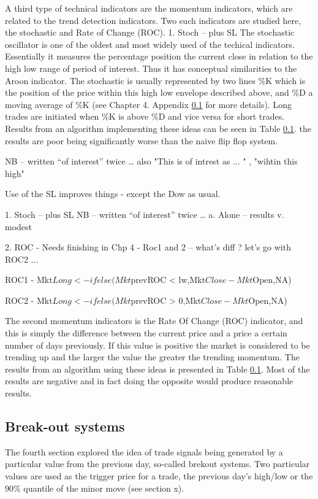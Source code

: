 A third type of technical indicators are the momentum indicators, which are related to the trend detection indicators. Two such indicators are studied here, the stochastic and Rate of Change (ROC). 
1.	Stoch – plus SL
The stochastic oscillator is one of the oldest and most widely used of the techical indicators. Essentially it measures the percentage position the current close in relation to the high low range of period of interest. Thus it has conceptual similarities to the Aroon indicator. The stochastic is usually represented by two lines \%K which is the position of the price within this high low envelope described above, and \%D a moving average of \%K (see Chapter 4.  Appendix \ref{} for more details). Long trades are initiated when \%K is above \%D and vice versa for short trades. Results from an algorithm implementing these ideas can be seen in Table \ref{}. the results are poor being significantly worse than the naive flip flop system. 

NB – written “of interest” twice … also "This is of intrest as ... " , "wihtin this high"

Use of the SL improves things - except the Dow as usual.

1.	Stoch – plus SL
NB – written “of interest” twice …
a.	Alone – results v. modest


2.	ROC
-	Needs finishing in Chp 4
-	Roc1 and 2 – what’s diff ? let's go with ROC2 ...

ROC1 - Mkt$Long <- ifelse(Mkt$prevROC < lw,Mkt$Close-Mkt$Open,NA)

ROC2 - Mkt$Long <- ifelse(Mkt$prevROC > 0,Mkt$Close-Mkt$Open,NA)

The second momentum indicators is the Rate Of Change (ROC) indicator, and this is simply the difference between the current price and a price a certain number of days previously. If this value is positive the market is considered to be trending up and the larger the value the greater the trending momentum. The results from an algorithm using these ideas is presented in Table \ref{}. Most of the results are negative and in fact doing the opposite would produce reasonable results.


\subsection{Break-out systems}

The fourth section explored the idea of trade signals being generated by a particular value from the previous day, so-called brekout systems. Two particular values are used as the trigger price for a trade, the previous day's high/low or the 90\% quantile of the minor move (see section x). 

